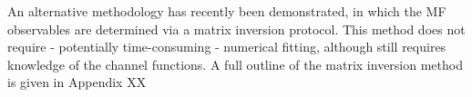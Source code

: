 An alternative methodology has recently been demonstrated, in which the MF observables are determined via a matrix inversion protocol. This method does not require - potentially time-consuming - numerical fitting, although still requires knowledge of the channel functions. A full outline of the matrix inversion method is given in Appendix XX


